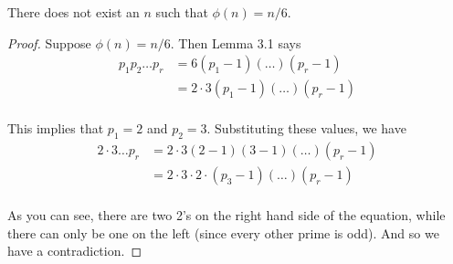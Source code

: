 \begin{prop}[11.12c]
    There does not exist an $n$ such that $\phi(n) = n/6$.
\end{prop}
\begin{proof}
    Suppose $\phi(n) = n/6$. Then Lemma 3.1 says
    \begin{align*}
    p_1 p_2 \ldots p_r &= 6 (p_1 - 1)(\ldots)(p_r - 1) \\
                       &= 2 \cdot 3 (p_1 - 1)(\ldots)(p_r - 1) \\
    \end{align*}
    
    This implies that $p_1 = 2$ and $p_2 = 3$. Substituting these values, we
    have
    \begin{align*}
    2 \cdot 3 \ldots p_r &= 2 \cdot 3 (2 - 1)(3-1)(\ldots)(p_r - 1)\\
                         &= 2 \cdot 3 \cdot 2 \cdot (p_3 - 1)(\ldots)(p_r - 1)\\
    \end{align*} 
    
    As you can see, there are two 2's on the right hand side of the equation, 
    while there can only be one on the left (since every other prime is odd).
    And so we have a contradiction.
\end{proof}

